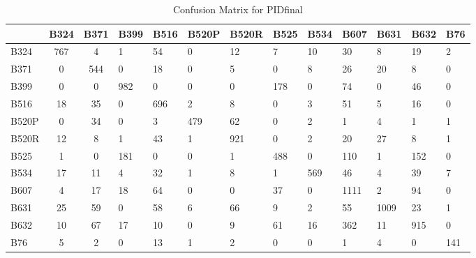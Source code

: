 \begin{table}[htbp]
\centering
\caption{Confusion Matrix for PIDfinal}
\label{tab:confusionmatrix.PIDfinal}
\begin{tabular}{|l|cc|}
\toprule
 & B324 & B371 & B399 & B516 & B520P & B520R & B525 & B534 & B607 & B631 & B632 & B76 \\
\midrule
B324 & 767 & 4 & 1 & 54 & 0 & 12 & 7 & 10 & 30 & 8 & 19 & 2 \\
B371 & 0 & 544 & 0 & 18 & 0 & 5 & 0 & 8 & 26 & 20 & 8 & 0 \\
B399 & 0 & 0 & 982 & 0 & 0 & 0 & 178 & 0 & 74 & 0 & 46 & 0 \\
B516 & 18 & 35 & 0 & 696 & 2 & 8 & 0 & 3 & 51 & 5 & 16 & 0 \\
B520P & 0 & 34 & 0 & 3 & 479 & 62 & 0 & 2 & 1 & 4 & 1 & 1 \\
B520R & 12 & 8 & 1 & 43 & 1 & 921 & 0 & 2 & 20 & 27 & 8 & 1 \\
B525 & 1 & 0 & 181 & 0 & 0 & 1 & 488 & 0 & 110 & 1 & 152 & 0 \\
B534 & 17 & 11 & 4 & 32 & 1 & 8 & 1 & 569 & 46 & 4 & 39 & 7 \\
B607 & 4 & 17 & 18 & 64 & 0 & 0 & 37 & 0 & 1111 & 2 & 94 & 0 \\
B631 & 25 & 59 & 0 & 58 & 6 & 66 & 9 & 2 & 55 & 1009 & 23 & 1 \\
B632 & 10 & 67 & 17 & 10 & 0 & 9 & 61 & 16 & 362 & 11 & 915 & 0 \\
B76 & 5 & 2 & 0 & 13 & 1 & 2 & 0 & 0 & 1 & 4 & 0 & 141 \\
\bottomrule
\end{tabular}
\end{table}
